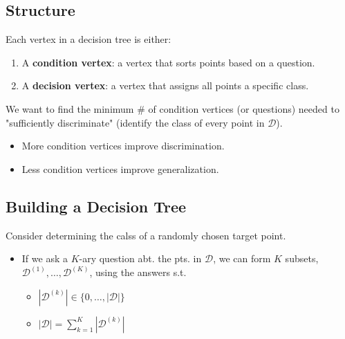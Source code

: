 \subsection{Structure}
\begin{definition}
    Each vertex in a decision tree is either:
    \begin{enumerate}
        \item A \textbf{condition vertex}: a vertex that sorts points based on a question.
        \item A \textbf{decision vertex}: a vertex that assigns all points a specific class.
    \end{enumerate}
\end{definition}

\begin{notes}
    We want to find the minimum \# of condition vertices (or questions) needed to "sufficiently discriminate" (identify the class of every point in \(\mathcal{D}\)).
    \begin{itemize}
        \item More condition vertices improve discrimination.
        \item Less condition vertices improve generalization.
    \end{itemize}
\end{notes}

\subsection{Building a Decision Tree}
\begin{definition}
    Consider determining the calss of a randomly chosen target point. 
    \begin{itemize}
        \item If we ask a $K$-ary question abt. the pts. in $\mathcal{D}$, we can form $K$ subsets, $\mathcal{D}^{(1)},\ldots,\mathcal{D}^{(K)}$, using the answers s.t. 
        \begin{itemize}
            \item $|\mathcal{D}^{(k)}| \in \{0,\ldots,|\mathcal{D}|\}$
            \item $|\mathcal{D}| = \sum_{k=1}^{K} |\mathcal{D}^{(k)}|$
        \end{itemize}
    \end{itemize}
\end{definition}

